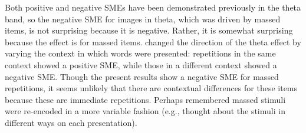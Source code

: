 Both positive and negative SMEs have been demonstrated previously in the theta band, so the negative SME for images in theta, which was driven by massed items, is not surprising because it is negative.  Rather, it is somewhat surprising because the effect is for massed items.   changed the direction of the theta effect by varying the context in which words were presented: repetitions in the same context showed a positive SME, while those in a different context showed a negative SME.  Though the present results show a negative SME for massed repetitions, it seems unlikely that there are contextual differences for these items because these are immediate repetitions.  Perhaps remembered massed stimuli were re-encoded in a more variable fashion (e.g., thought about the stimuli in different ways on each presentation).
\cbend




